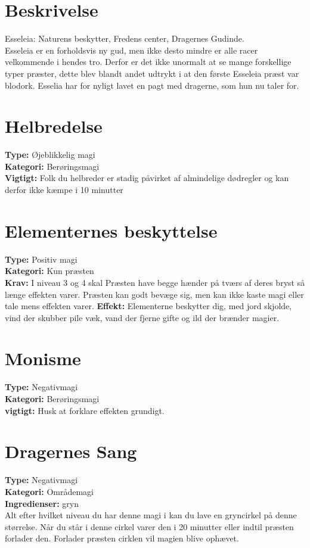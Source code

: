 \section{Beskrivelse}
Esseleia: Naturens beskytter, Fredens center, Dragernes Gudinde.\\ Esseleia er en forholdsvis ny gud, men ikke desto mindre er alle racer velkommende i hendes tro. Derfor er det ikke unormalt at se mange forskellige typer præster, dette blev blandt andet udtrykt i at den første Esseleia præst var blodork. Esselia har for nyligt lavet en pagt med dragerne, som hun nu taler for.

\section{Helbredelse}
\textbf{Type:} Øjeblikkelig magi \\
\textbf{Kategori:} Berøringsmagi\\
\textbf{Vigtigt:} Folk du helbreder er stadig påvirket af almindelige dødregler og kan derfor ikke kæmpe i 10 minutter

\section{Elementernes beskyttelse}
\textbf{Type:} Positiv magi\\
\textbf{Kategori:} Kun præsten\\
\textbf{Krav:} I niveau 3 og 4 skal Præsten have begge hænder på tværs af deres bryst så længe effekten varer. Præsten kan godt bevæge sig, men kan ikke kaste magi eller tale mens effekten varer.
\textbf{Effekt:} Elementerne beskytter dig, med jord skjolde, vind der skubber pile væk, vand der fjerne gifte og ild der brænder magier.

\section{Monisme}
\textbf{Type:} Negativmagi\\
\textbf{Kategori:} Berøringsmagi\\
\textbf{vigtigt:} Husk at forklare effekten grundigt.


\section{Dragernes Sang}
\textbf{Type:} Negativmagi\\
\textbf{Kategori:} Områdemagi\\
\textbf{Ingredienser:} gryn\\
Alt efter hvilket niveau du har denne magi i kan du lave en gryncirkel på denne størrelse. Når du står i denne cirkel varer den i 20 minutter eller indtil præsten forlader den. Forlader præsten cirklen vil magien blive ophævet.
